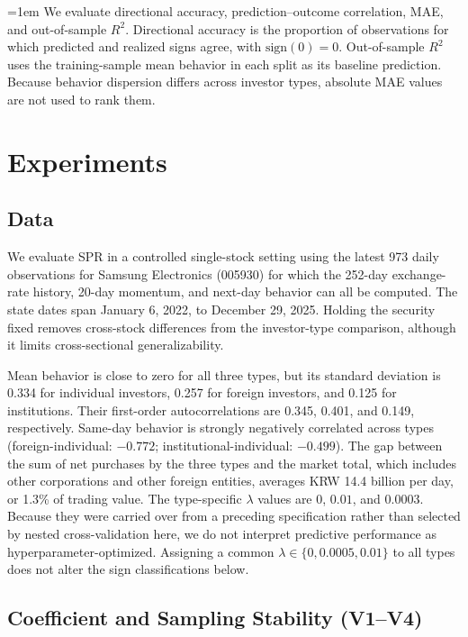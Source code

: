 {\emergencystretch=1em
We evaluate directional accuracy, prediction--outcome correlation, MAE, and out-of-sample
$R^2$. Directional accuracy is the proportion of observations for which predicted and
realized signs agree, with $\mathrm{sign}(0)=0$. Out-of-sample $R^2$ uses the training-sample
mean behavior in each split as its baseline prediction. Because behavior dispersion differs
across investor types, absolute MAE values are not used to rank them.
}

\section{Experiments}
\label{sec:experiments}

\subsection{Data}
\label{sec:data}

We evaluate SPR in a controlled single-stock setting using the latest 973 daily observations
for Samsung Electronics (005930) for which the
252-day exchange-rate history, 20-day momentum, and next-day behavior can all be computed.
The state dates span January 6, 2022, to December 29, 2025. Holding the security fixed
removes cross-stock differences from the investor-type comparison, although it limits
cross-sectional generalizability.

Mean behavior is close to zero for all three types, but its standard deviation is 0.334 for
individual investors, 0.257 for foreign investors, and 0.125 for institutions. Their
first-order autocorrelations are 0.345, 0.401, and 0.149, respectively. Same-day behavior
is strongly negatively correlated across types (foreign-individual: $-0.772$;
institutional-individual: $-0.499$). The gap between the sum of net purchases by the three
types and the market total, which includes other corporations and other foreign entities,
averages KRW 14.4 billion per day, or 1.3\% of trading value. The type-specific $\lambda$
values are $0$, $0.01$, and $0.0003$. Because they were carried over from a preceding
specification rather than selected by nested cross-validation here, we do not interpret
predictive performance as hyperparameter-optimized. Assigning a common
$\lambda\in\{0,0.0005,0.01\}$ to all types does not alter the sign classifications below.

\subsection{Coefficient and Sampling Stability (V1--V4)}
\label{sec:stability}

